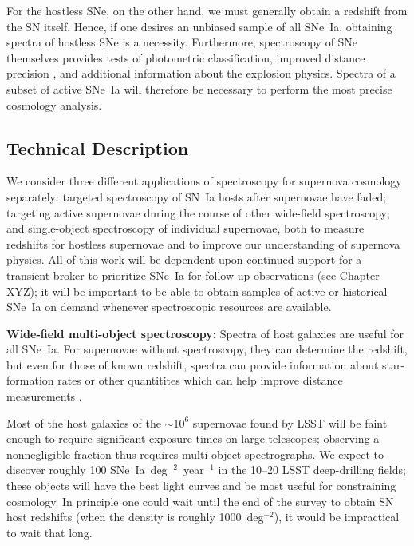 For the hostless SNe, on the other
hand, we must generally obtain a redshift from the SN itself.  Hence, if one
desires an unbiased sample of all SNe~Ia, obtaining spectra of
hostless SNe is a necessity.  Furthermore, spectroscopy of SNe themselves provides tests of
photometric classification, improved distance precision
\citep{Bailey09, Blondin11, Foley11:vel}, and additional information
about the explosion physics.  Spectra of a subset of active SNe~Ia will therefore be necessary to
perform the most precise cosmology analysis.

\subsection{Technical Description}

We consider three different applications of spectroscopy for supernova cosmology separately: targeted spectroscopy of SN~Ia hosts after supernovae have faded; targeting active supernovae during the course of other wide-field spectroscopy; and single-object spectroscopy of individual supernovae, both to measure redshifts for hostless supernovae and to improve our understanding of supernova physics.  All of this work will be dependent upon continued support for a transient broker to prioritize SNe~Ia for follow-up observations (see Chapter XYZ);  it will be important to be able to obtain samples of active or historical SNe~Ia on demand whenever spectroscopic resources are available.   

{\bf Wide-field multi-object spectroscopy:}  Spectra of host galaxies are useful for all SNe~Ia.  For supernovae without spectroscopy, they can determine the redshift, but even for those of known redshift, spectra
can provide information about star-formation rates or other quantitites which can
help improve distance measurements \citep[e.g.,][]{Pan14}.  

Most of the host galaxies of the $\sim 10^{6}$ supernovae found by LSST will be faint enough to
require significant exposure times on large telescopes; observing a nonnegligible fraction thus requires multi-object spectrographs.      
We expect to discover roughly 100 SNe~Ia~deg$^{-2}$~year$^{-1}$ in the 10--20 LSST
deep-drilling fields; these objects will have the best light curves and be most useful for constraining cosmology.  In principle one could wait until the end of the survey to obtain SN host redshifts (when the density is roughly
1000~deg$^{-2}$), it would be impractical to wait that long.  

